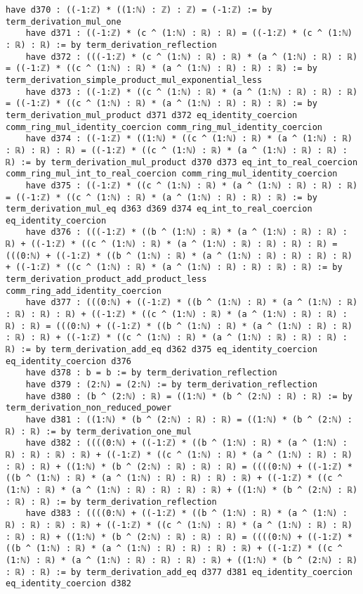 \documentclass{article}
\begin{document}
\begin{tcolorbox}[colback=white!10, width=\linewidth]
\begin{lstlisting}[language=Lean4]
    have d370 : ((-1:ℤ) * ((1:ℕ) : ℤ) : ℤ) = (-1:ℤ) := by term_derivation_mul_one
    have d371 : ((-1:ℤ) * (c ^ (1:ℕ) : ℝ) : ℝ) = ((-1:ℤ) * (c ^ (1:ℕ) : ℝ) : ℝ) := by term_derivation_reflection
    have d372 : (((-1:ℤ) * (c ^ (1:ℕ) : ℝ) : ℝ) * (a ^ (1:ℕ) : ℝ) : ℝ) = ((-1:ℤ) * ((c ^ (1:ℕ) : ℝ) * (a ^ (1:ℕ) : ℝ) : ℝ) : ℝ) := by term_derivation_simple_product_mul_exponential_less
    have d373 : ((-1:ℤ) * ((c ^ (1:ℕ) : ℝ) * (a ^ (1:ℕ) : ℝ) : ℝ) : ℝ) = ((-1:ℤ) * ((c ^ (1:ℕ) : ℝ) * (a ^ (1:ℕ) : ℝ) : ℝ) : ℝ) := by term_derivation_mul_product d371 d372 eq_identity_coercion comm_ring_mul_identity_coercion comm_ring_mul_identity_coercion
    have d374 : ((-1:ℤ) * ((1:ℕ) * ((c ^ (1:ℕ) : ℝ) * (a ^ (1:ℕ) : ℝ) : ℝ) : ℝ) : ℝ) = ((-1:ℤ) * ((c ^ (1:ℕ) : ℝ) * (a ^ (1:ℕ) : ℝ) : ℝ) : ℝ) := by term_derivation_mul_product d370 d373 eq_int_to_real_coercion comm_ring_mul_int_to_real_coercion comm_ring_mul_identity_coercion
    have d375 : ((-1:ℤ) * ((c ^ (1:ℕ) : ℝ) * (a ^ (1:ℕ) : ℝ) : ℝ) : ℝ) = ((-1:ℤ) * ((c ^ (1:ℕ) : ℝ) * (a ^ (1:ℕ) : ℝ) : ℝ) : ℝ) := by term_derivation_mul_eq d363 d369 d374 eq_int_to_real_coercion eq_identity_coercion
    have d376 : (((-1:ℤ) * ((b ^ (1:ℕ) : ℝ) * (a ^ (1:ℕ) : ℝ) : ℝ) : ℝ) + ((-1:ℤ) * ((c ^ (1:ℕ) : ℝ) * (a ^ (1:ℕ) : ℝ) : ℝ) : ℝ) : ℝ) = (((0:ℕ) + ((-1:ℤ) * ((b ^ (1:ℕ) : ℝ) * (a ^ (1:ℕ) : ℝ) : ℝ) : ℝ) : ℝ) + ((-1:ℤ) * ((c ^ (1:ℕ) : ℝ) * (a ^ (1:ℕ) : ℝ) : ℝ) : ℝ) : ℝ) := by term_derivation_product_add_product_less comm_ring_add_identity_coercion
    have d377 : (((0:ℕ) + ((-1:ℤ) * ((b ^ (1:ℕ) : ℝ) * (a ^ (1:ℕ) : ℝ) : ℝ) : ℝ) : ℝ) + ((-1:ℤ) * ((c ^ (1:ℕ) : ℝ) * (a ^ (1:ℕ) : ℝ) : ℝ) : ℝ) : ℝ) = (((0:ℕ) + ((-1:ℤ) * ((b ^ (1:ℕ) : ℝ) * (a ^ (1:ℕ) : ℝ) : ℝ) : ℝ) : ℝ) + ((-1:ℤ) * ((c ^ (1:ℕ) : ℝ) * (a ^ (1:ℕ) : ℝ) : ℝ) : ℝ) : ℝ) := by term_derivation_add_eq d362 d375 eq_identity_coercion eq_identity_coercion d376
    have d378 : b = b := by term_derivation_reflection
    have d379 : (2:ℕ) = (2:ℕ) := by term_derivation_reflection
    have d380 : (b ^ (2:ℕ) : ℝ) = ((1:ℕ) * (b ^ (2:ℕ) : ℝ) : ℝ) := by term_derivation_non_reduced_power
    have d381 : ((1:ℕ) * (b ^ (2:ℕ) : ℝ) : ℝ) = ((1:ℕ) * (b ^ (2:ℕ) : ℝ) : ℝ) := by term_derivation_one_mul
    have d382 : ((((0:ℕ) + ((-1:ℤ) * ((b ^ (1:ℕ) : ℝ) * (a ^ (1:ℕ) : ℝ) : ℝ) : ℝ) : ℝ) + ((-1:ℤ) * ((c ^ (1:ℕ) : ℝ) * (a ^ (1:ℕ) : ℝ) : ℝ) : ℝ) : ℝ) + ((1:ℕ) * (b ^ (2:ℕ) : ℝ) : ℝ) : ℝ) = ((((0:ℕ) + ((-1:ℤ) * ((b ^ (1:ℕ) : ℝ) * (a ^ (1:ℕ) : ℝ) : ℝ) : ℝ) : ℝ) + ((-1:ℤ) * ((c ^ (1:ℕ) : ℝ) * (a ^ (1:ℕ) : ℝ) : ℝ) : ℝ) : ℝ) + ((1:ℕ) * (b ^ (2:ℕ) : ℝ) : ℝ) : ℝ) := by term_derivation_reflection
    have d383 : ((((0:ℕ) + ((-1:ℤ) * ((b ^ (1:ℕ) : ℝ) * (a ^ (1:ℕ) : ℝ) : ℝ) : ℝ) : ℝ) + ((-1:ℤ) * ((c ^ (1:ℕ) : ℝ) * (a ^ (1:ℕ) : ℝ) : ℝ) : ℝ) : ℝ) + ((1:ℕ) * (b ^ (2:ℕ) : ℝ) : ℝ) : ℝ) = ((((0:ℕ) + ((-1:ℤ) * ((b ^ (1:ℕ) : ℝ) * (a ^ (1:ℕ) : ℝ) : ℝ) : ℝ) : ℝ) + ((-1:ℤ) * ((c ^ (1:ℕ) : ℝ) * (a ^ (1:ℕ) : ℝ) : ℝ) : ℝ) : ℝ) + ((1:ℕ) * (b ^ (2:ℕ) : ℝ) : ℝ) : ℝ) := by term_derivation_add_eq d377 d381 eq_identity_coercion eq_identity_coercion d382

\end{lstlisting}
\end{tcolorbox}
\end{document}
